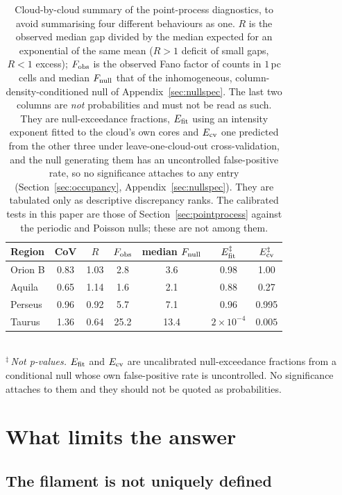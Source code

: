 \documentclass[usenatbib,twoside,twocolumn]{mnras}
\begin{document}
\begin{table}
\caption{Cloud-by-cloud summary of the point-process diagnostics, to avoid summarising four different behaviours as one. $R$ is the observed median gap divided by the median expected for an exponential of the same mean ($R>1$ deficit of small gaps, $R<1$ excess); $F_{\rm obs}$ is the observed Fano factor of counts in $1$\,pc cells and median $F_{\rm null}$ that of the inhomogeneous, column-density-conditioned null of Appendix~\ref{sec:nullspec}. The last two columns are \emph{not} probabilities and must not be read as such. They are null-exceedance fractions, $E_{\rm fit}$ using an intensity exponent fitted to the cloud's own cores and $E_{\rm cv}$ one predicted from the other three under leave-one-cloud-out cross-validation, and the null generating them has an uncontrolled false-positive rate, so no significance attaches to any entry (Section~\ref{sec:occupancy}, Appendix~\ref{sec:nullspec}). They are tabulated only as descriptive discrepancy ranks. The calibrated tests in this paper are those of Section~\ref{sec:pointprocess} against the periodic and Poisson nulls; these are not among them.}
\label{tab:percloud}
\footnotesize
\setlength{\tabcolsep}{3.5pt}
\begin{tabular}{lcccccc}
\toprule
Region & CoV & $R$ & $F_{\rm obs}$ & median $F_{\rm null}$ & $E_{\rm fit}^{\ddagger}$ & $E_{\rm cv}^{\ddagger}$ \\
\midrule
Orion B & 0.83 & 1.03 & 2.8  & 3.6  & 0.98 & 1.00 \\
Aquila  & 0.65 & 1.14 & 1.6  & 2.1  & 0.88 & 0.27 \\
Perseus & 0.96 & 0.92 & 5.7  & 7.1  & 0.96 & 0.995 \\
Taurus  & 1.36 & 0.64 & 25.2 & 13.4 & $2\times10^{-4}$ & $0.005$ \\
\bottomrule
\end{tabular}
\\[2pt]
\footnotesize $^{\ddagger}$\,\emph{Not p-values.} $E_{\rm fit}$ and $E_{\rm cv}$ are uncalibrated null-exceedance fractions from a conditional null whose own false-positive rate is uncontrolled. No significance attaches to them and they should not be quoted as probabilities.
\end{table}


\section{What limits the answer}
\label{sec:ontology}

\subsection{The filament is not uniquely defined}
\end{document}
